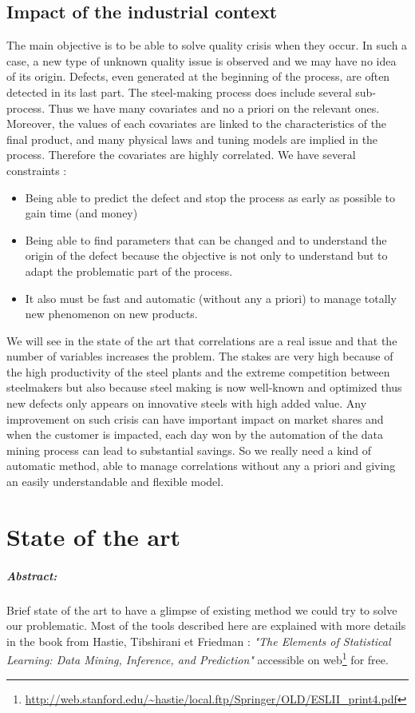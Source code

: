 \documentclass[12pt,a4paper]{report}
\begin{document}
	\section{Impact of the industrial context}
	 The main objective is to be able to solve quality crisis when they occur. In such a case, a new type of unknown quality issue is observed and we may have no idea of its origin. Defects, even generated at the beginning of the process, are often detected in its last part. The steel-making process does include several sub-process. Thus we have many covariates and no a priori on the relevant ones. Moreover, the values of each covariates are linked to the characteristics of the final product, and many physical laws and tuning models are implied in the process. Therefore the covariates are highly correlated.
	We have several constraints :
	\begin{itemize}
		\item Being able to predict the defect and stop the process as early as possible to gain time (and money)
		\item Being able to find parameters that can be changed and to understand the origin of the defect because the objective is not only to understand but to adapt the problematic part of the process.
		\item It also must be fast and automatic (without any a priori) to manage totally new phenomenon on new products.
	\end{itemize}
	We will see in the state of the art that correlations are a real issue and that the number of variables increases the problem.	
	The stakes are very high because of the high productivity of the steel plants and the extreme competition between steelmakers but also because steel making is now well-known and optimized thus new defects only appears on innovative steels with high added value. Any improvement on such crisis can have important impact on market shares and when the customer is impacted, each day won by the automation of the data mining process can lead to substantial savings. So we really need a kind of automatic method, able to manage correlations without any a priori and giving an easily understandable and flexible model.
	
\chapter{State of the art}
\paragraph{Abstract:} Brief state of the art to have a glimpse of existing method we could try to solve our problematic.
Most of the tools described here are explained with more details in the book from  Hastie, Tibshirani et Friedman : {\it "The Elements of Statistical Learning: Data Mining, Inference, and Prediction" } accessible on web\footnote{ \url{http://web.stanford.edu/~hastie/local.ftp/Springer/OLD/ESLII_print4.pdf}} for free.
	
\end{document}
